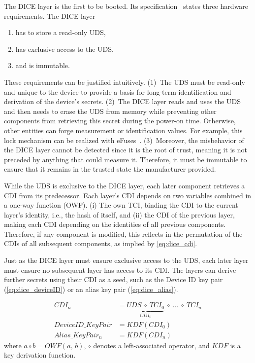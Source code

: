 The DICE layer is the first to be booted.
Its specification~\cite{dice-hardware-reqs} states three hardware requirements.
The DICE layer 
\begin{enumerate}
  \item has to store a read-only \ac{UDS},
  \item has exclusive access to the \ac{UDS},
  \item and is immutable.
\end{enumerate}
These requirements can be justified intuitively.
(1)~The \ac{UDS} must be read-only and unique to the device to provide a basis for long-term identification and derivation of the device's secrets.
(2)~The DICE layer reads and uses the \ac{UDS} and then needs to erase the \ac{UDS} from memory while preventing other components from retrieving this secret during the power-on time.
Otherwise, other entities can forge measurement or identification values.
For example, this lock mechanism can be realized with eFuses~\cite{dice-hardware-reqs}.
(3)~Moreover, the misbehavior of the DICE layer cannot be detected since it is the root of trust, meaning it is not preceded by anything that could measure it.
Therefore, it must be immutable to ensure that it remains in the trusted state the manufacturer provided.


While the \ac{UDS} is exclusive to the DICE layer, each later component retrieves a \ac{CDI} from its predecessor.
Each layer's \ac{CDI} depends on two variables combined in a one-way function (OWF).
(i) The own \ac{TCI}, binding the \ac{CDI} to the current layer's identity, i.e., the hash of itself, and (ii) the \ac{CDI} of the previous layer, making each \ac{CDI} depending on the identities of all previous components.
Therefore, if any component is modified, this reflects in the permutation of the \acp{CDI} of all subsequent components, as implied by \autoref{eq:dice_cdi}.


Just as the DICE layer must ensure exclusive access to the \ac{UDS}, each later layer must ensure no subsequent layer has access to its \ac{CDI}\@.
The layers can derive further secrets using their \ac{CDI} as a seed, such as the Device ID key pair (\autoref{eq:dice_deviceID}) or an alias key pair (\autoref{eq:dice_alias}).

\noindent
\begin{minipage}{\linewidth}
\begin{align}
  \label{eq:dice_cdi}
  CDI_n &= \underbrace{UDS\ \circ\ TCI_0}_{CDI_0}\ \circ\ \ldots\ \circ\ TCI_n\\
  \label{eq:dice_deviceID}
  DeviceID\_KeyPair &= KDF(CDI_0)\\
  \label{eq:dice_alias}
  Alias\_KeyPair_n  &= KDF(CDI_n)
\end{align}
where \(a \circ b = OWF(a,\,b)\), \(\circ\) denotes a left-associated operator, and \(KDF\) is a key derivation function.
\end{minipage}
\baselineskip

